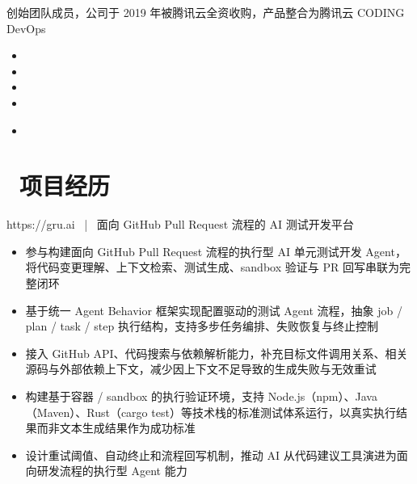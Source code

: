 \documentclass{resume}
\begin{document}
创始团队成员，公司于 2019 年被腾讯云全资收购，产品整合为腾讯云 CODING DevOps
\begin{itemize}
  \item {}
  \item {}
  \item {}
  \item {}
\end{itemize}

\begin{itemize}
  \item {}
\end{itemize}

\section{\texorpdfstring{\faUsers\ 项目经历}{项目经历}}

https://gru.ai \ | \ 面向 GitHub Pull Request 流程的 AI 测试开发平台
\begin{onehalfspacing}
\begin{itemize}
  \item 参与构建面向 GitHub Pull Request 流程的执行型 AI 单元测试开发 Agent，将代码变更理解、上下文检索、测试生成、sandbox 验证与 PR 回写串联为完整闭环
  \item 基于统一 Agent Behavior 框架实现配置驱动的测试 Agent 流程，抽象 job / plan / task / step 执行结构，支持多步任务编排、失败恢复与终止控制
  \item 接入 GitHub API、代码搜索与依赖解析能力，补充目标文件调用关系、相关源码与外部依赖上下文，减少因上下文不足导致的生成失败与无效重试
  \item 构建基于容器 / sandbox 的执行验证环境，支持 Node.js（npm）、Java（Maven）、Rust（cargo test）等技术栈的标准测试体系运行，以真实执行结果而非文本生成结果作为成功标准
  \item 设计重试阈值、自动终止和流程回写机制，推动 AI 从代码建议工具演进为面向研发流程的执行型 Agent 能力
\end{itemize}
\end{onehalfspacing}
\end{document}
